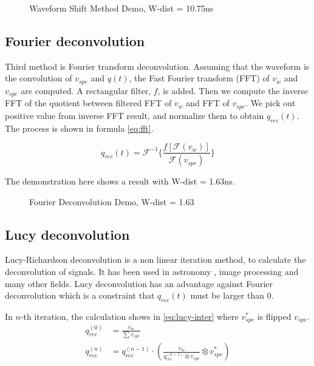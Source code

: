 \begin{figure}[H]
    \centering
    \scalebox{0.4}{}
    \caption{Waveform Shift Method Demo, W-dist = 10.75ns}
\end{figure}

\subsection{Fourier deconvolution}

Third method is Fourier transform deconvolution. Assuming that the waveform is the convolution of $v_{spe}$ and $q(t)$, the Fast Fourier transform (FFT) of $v_{w}$ and $v_{spe}$ are computed. A rectangular filter, $f$, is added. Then we compute the inverse FFT of the quotient between filtered FFT of $v_{w}$ and FFT of $v_{spe}$. We pick out positive value from inverse FFT result, and normalize them to obtain $q_{rec}(t)$. The process is shown in formula \eqref{eq:fft}. 

\begin{equation}
    q_{rec}(t) = \mathcal{F}^{-1}\{\frac{f[\mathcal{F}(v_{w})]}{\mathcal{F}(v_{spe})}\}
    \label{eq:fft}
\end{equation}

The demonstration here shows a result with W-dist = 1.63ns. 

\begin{figure}[H]
    \centering
    \scalebox{0.4}{}
    \caption{Fourier Deconvolution Demo, W-dist = 1.63}
\end{figure}

\subsection{Lucy deconvolution}

Lucy-Richardson deconvolution is a non linear iteration method, to calculate the deconvolution of signals. It has been used in astronomy \cite{li_richardson-lucy_2019}, image processing and many other fields. Lucy deconvolution has an advantage against Fourier deconvolution which is a constraint that $q_{rec}(t)$ must be larger than 0. 

In $n$-th iteration, the calculation shows in \eqref{eq:lucy-inter} where $v^{*}_{spe}$ is flipped $v_{spe}$. 
\begin{align}
    q_{rec}^{(0)} &= \frac{v_{w}}{\sum v_{spe}} \\
    q_{rec}^{(n)} &= q_{rec}^{(n-1)} \cdot \left(\frac{v_{w}}{q_{rec}^{(n-1)} \otimes v_{spe}} \otimes v^{*}_{spe}\right) \label{eq:lucy-inter}
\end{align}

